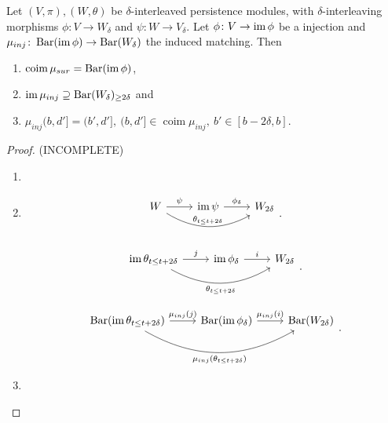 \begin{lemma} \cite[Proposition 3.2.2]{polterovich}
    Let $ (V, \pi), (W, \theta) $ be $\delta$-interleaved persistence modules, with $\delta$-inter\-leaving morphisms $ \phi\colon V \to W_\delta $ and $ \psi\colon W \to V_\delta $. Let $ \phi\colon V \to \operatorname{im}\phi $ be a injection and $ \mu_{inj}\colon \operatorname{Bar}(\operatorname{im} \phi) \to \operatorname{Bar} (W_\delta)$ the induced matching. Then
    \begin{enumerate}
        \item $\operatorname{coim} \mu_{sur} = \operatorname{Bar} (\operatorname{im} \phi) $,
        \item $ \operatorname{im} \mu_{inj} \supseteq \operatorname{Bar} (W_\delta)_{\geq 2\delta} $ and
        \item $ \mu_{inj}(b, d'] = (b', d'], \ (b, d'] \in \operatorname{coim} \mu_{inj}, \ b' \in [b-2\delta, b]$.
    \end{enumerate}
\end{lemma}
\begin{proof} (INCOMPLETE)
\begin{enumerate}
    \item 
    \item 
    $$
    \begin{tikzcd}
        W \arrow[r, "\psi"] \arrow[rr, "\theta_{t \leq t+2\delta}", bend right] 
        & \im \psi \arrow[r, "\phi_\delta"] 
        & W_{2\delta} \\
    \end{tikzcd}.
    $$

    $$
    \begin{tikzcd}
        \im \theta_{t \leq t+2\delta} \arrow[r, "j"] \arrow[rr, "\theta_{t \leq t+2\delta}"', bend right] 
        & \im \phi_\delta \arrow[r, "i"] 
        & W_{2\delta} \\
    \end{tikzcd}.
    $$

    $$
    \begin{tikzcd}
        \barc(\im \theta_{t \leq t+2\delta}) \arrow[r, "\mu_{inj}(j)"] \arrow[rr, "\mu_{inj}(\theta_{t \leq t+2\delta})"', bend right] 
        & \barc(\im \phi_\delta) \arrow[r, "\mu_{inj}(i)"] 
        & \barc(W_{2\delta}) \\
    \end{tikzcd}.
    $$
    \item 
\end{enumerate}
\end{proof}

